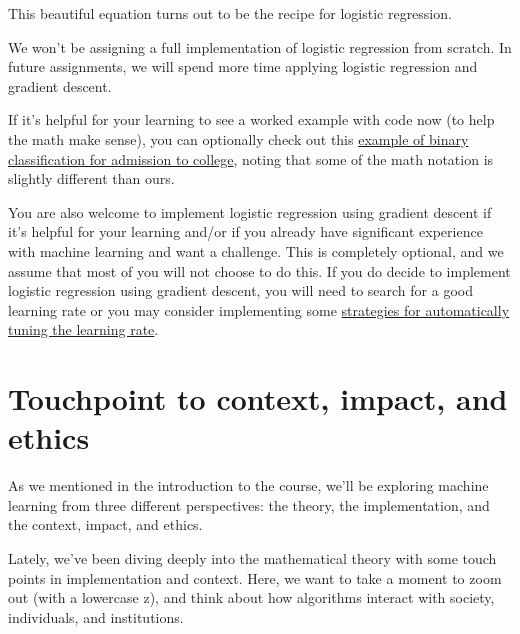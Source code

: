 \documentclass[assignment04_Solutions]{subfiles}
\begin{document}
This beautiful equation turns out to be the recipe for logistic regression. \\

\begin{notice}
We won't be assigning a full implementation of logistic regression from scratch. In future assignments, we will spend more time applying logistic regression and gradient descent. 

If it's helpful for your learning to see a worked example with code now (to help the math make sense), you can optionally check out this \href{https://towardsdatascience.com/building-a-logistic-regression-in-python-301d27367c24}{example of binary classification for admission to college}, noting that some of the math notation is slightly different than ours. 

You are also welcome to implement logistic regression using gradient descent if it's helpful for your learning and/or if you already have significant experience with machine learning and want a challenge. This is completely optional, and we assume that most of you will not choose to do this. If you do decide to implement logistic regression using gradient descent, you will need to search for a good learning rate or you may consider implementing some \href{https://towardsdatascience.com/gradient-descent-algorithms-and-adaptive-learning-rate-adjustment-methods-79c701b086be}{strategies for automatically tuning the learning rate}.


\end{notice}





\section{Touchpoint to context, impact, and ethics}

As we mentioned in the introduction to the course, we'll be exploring machine learning from three different perspectives: the theory, the implementation, and the context, impact, and ethics. 


Lately, we've been diving deeply into the mathematical theory with some touch points in implementation and context. Here, we want to take a moment to zoom out (with a lowercase z), and think about how algorithms interact with society, individuals, and institutions. 
\end{document}
